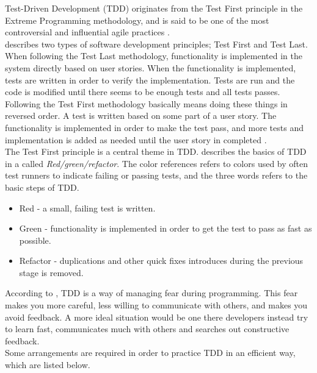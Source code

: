 Test-Driven Development (TDD) originates from the Test First principle
in the Extreme Programming methodology, and is said to be one of the
most controversial and influential agile practices
\cite{book:tdd_madeyski}.\\

\citet{book:tdd_madeyski} describes two types of software development
principles; Test First and Test Last. When following the Test Last
methodology, functionality is implemented in the system directly based
on user stories. When the functionality is implemented, tests are
written in order to verify the implementation. Tests are run and the
code is modified until there seems to be enough tests and all tests
passes.\\

Following the Test First methodology basically means doing these things
in reversed order. A test is written based on some part of a user story.
The functionality is implemented in order to make the test pass, and
more tests and implementation is added as needed until the user story in
completed \cite{book:tdd_madeyski}.\\

The Test First principle is a central theme in TDD.
\citet{book:tdd_beck} describes the basics of TDD in a 
called \emph{Red/green/refactor}. The color references refers to colors
used by often test runners to indicate failing or passing tests, and the
three words refers to the basic steps of TDD.

\begin{itemize}
    \item Red - a small, failing test is written.
    \item Green - functionality is implemented in order to get the test
          to pass as fast as possible.
    \item Refactor - duplications and other quick fixes introduces
          during the previous stage is removed.
\end{itemize}

According to \citeauthor{book:tdd_beck}, TDD is a way of managing fear
during programming. This fear makes you more careful, less willing to
communicate with others, and makes you avoid feedback. A more ideal
situation would be one there developers instead try to learn fast,
communicates much with others and searches out constructive feedback.\\

Some arrangements are required in order to practice TDD in an efficient
way, which are listed below.

